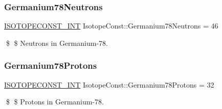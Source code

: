 \subsubsection{\texorpdfstring{Germanium78\+Neutrons}{Germanium78Neutrons}}
{\footnotesize\ttfamily \mbox{\hyperlink{group___isotope_const-_macros_ga5f18360b3e99483a35c32d789e62621c}{I\+S\+O\+T\+O\+P\+E\+C\+O\+N\+S\+T\+\_\+\+I\+NT}} Isotope\+Const\+::\+Germanium78\+Neutrons = 46}

\$ \$ Neutrons in Germanium-\/78. \mbox{\label{group___isotope_const-_germanium-_ge78_ga3d881c8dfbe9b98a10dd4c892b9fdf96}} 
\subsubsection{\texorpdfstring{Germanium78\+Protons}{Germanium78Protons}}
{\footnotesize\ttfamily \mbox{\hyperlink{group___isotope_const-_macros_ga5f18360b3e99483a35c32d789e62621c}{I\+S\+O\+T\+O\+P\+E\+C\+O\+N\+S\+T\+\_\+\+I\+NT}} Isotope\+Const\+::\+Germanium78\+Protons = 32}

\$ \$ Protons in Germanium-\/78. 